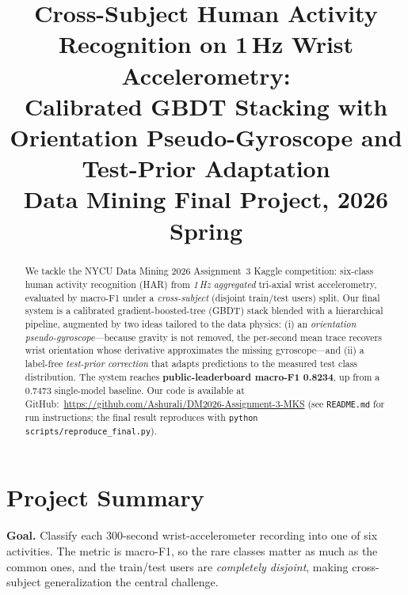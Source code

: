 \documentclass[conference]{IEEEtran}
\begin{document}


\title{Cross-Subject Human Activity Recognition on 1\,Hz Wrist Accelerometry:\\ Calibrated GBDT Stacking with Orientation Pseudo-Gyroscope and Test-Prior Adaptation\\
{\footnotesize Data Mining Final Project, 2026 Spring}
}

\author{
}

\maketitle


\begin{abstract}
We tackle the NYCU Data Mining 2026 Assignment~3 Kaggle competition: six-class human
activity recognition (HAR) from \emph{1\,Hz aggregated} tri-axial wrist accelerometry, evaluated by
macro-F1 under a \emph{cross-subject} (disjoint train/test users) split. Our final system is a calibrated
gradient-boosted-tree (GBDT) stack blended with a hierarchical pipeline, augmented by two ideas tailored to
the data physics: (i) an \emph{orientation pseudo-gyroscope}---because gravity is not removed, the per-second
mean trace recovers wrist orientation whose derivative approximates the missing gyroscope---and (ii) a
label-free \emph{test-prior correction} that adapts predictions to the measured test class distribution.
The system reaches \textbf{public-leaderboard macro-F1 0.8234}, up from a 0.7473 single-model baseline.
Our code is available at GitHub:~\href{https://github.com/Ashurali/DM2026-Assignment-3-MKS}{\color{blue}https://github.com/Ashurali/DM2026-Assignment-3-MKS} (see \texttt{README.md} for run instructions; the final result reproduces with \texttt{python scripts/reproduce\_final.py}).
\end{abstract}


\section{Project Summary}

\textbf{Goal.} Classify each 300-second wrist-accelerometer recording into one of six activities. The metric is
macro-F1, so the rare classes matter as much as the common ones, and the train/test users are
\emph{completely disjoint}, making cross-subject generalization the central challenge.
\end{document}
